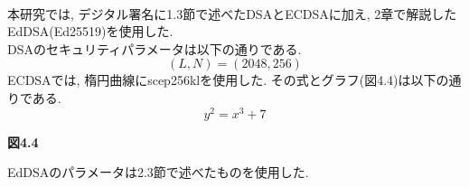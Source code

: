 \\
\indent 本研究では, デジタル署名に1.3節で述べたDSAとECDSAに加え, 
2章で解説したEdDSA(Ed25519)を使用した. \\ 
\indent DSAのセキュリティパラメータは以下の通りである. \\
\[
  (L,N)=(2048,256)
\]
\indent ECDSAでは, 楕円曲線にscep256klを使用した. 
その式とグラフ(図4.4)は以下の通りである. \\
\[
  y^2 = x^3 + 7 
\]

{\Large\textbf{図4.4}}

\indent EdDSAのパラメータは2.3節で述べたものを使用した.



